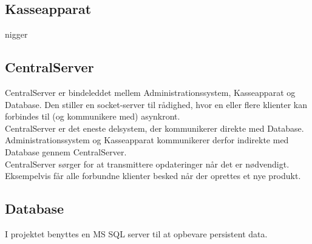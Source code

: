 \subsection{Kasseapparat}
nigger


\subsection{CentralServer}
CentralServer er bindeleddet mellem Administrationssystem, Kasseapparat og Database. Den stiller en socket-server til rådighed, hvor en eller flere klienter kan forbindes til (og kommunikere med) asynkront.\\

CentralServer er det eneste delsystem, der kommunikerer direkte med Database. Administrationssystem og Kasseapparat kommunikerer derfor indirekte med Database gennem CentralServer.\\

CentralServer sørger for at transmittere opdateringer når det er nødvendigt. Eksempelvis får alle forbundne klienter besked når der oprettes et nye produkt.

\subsection{Database}
I projektet benyttes en MS SQL server til at opbevare persistent data.
